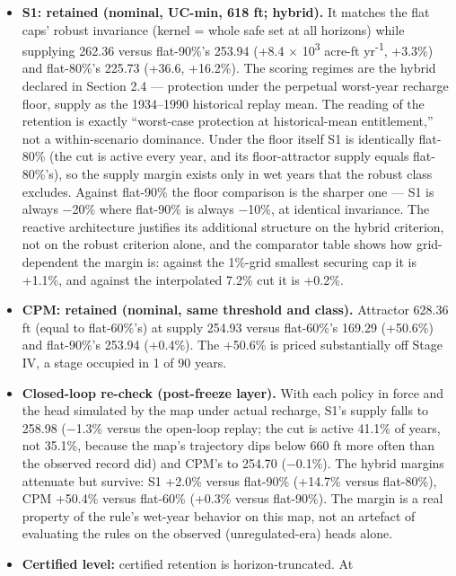 \documentclass[11pt]{article}
\providecommand{\tightlist}{\setlength{\itemsep}{0pt}\setlength{\parskip}{0pt}}
\begin{document}
\begin{itemize}
\tightlist
\item
  \textbf{S1: retained (nominal, UC-min, 618 ft; hybrid).} It matches
  the flat caps' robust invariance (kernel = whole safe set at all
  horizons) while supplying 262.36 versus flat-90\%'s 253.94 (+8.4 \ensuremath{\times} 10\textsuperscript{3}
  acre-ft yr\textsuperscript{-1}, +3.3\%) and flat-80\%'s 225.73 (+36.6, +16.2\%). The
  scoring regimes are the hybrid declared in Section 2.4 --- protection
  under the perpetual worst-year recharge floor, supply as the
  1934--1990 historical replay mean. The reading of the retention is
  exactly ``worst-case protection at historical-mean entitlement,'' not
  a within-scenario dominance. Under the floor itself S1 is identically
  flat-80\% (the cut is active every year, and its floor-attractor
  supply equals flat-80\%'s), so the supply margin exists only in wet
  years that the robust class excludes. Against flat-90\% the floor
  comparison is the sharper one --- S1 is always \ensuremath{-}20\% where flat-90\%
  is always \ensuremath{-}10\%, at identical invariance. The reactive architecture
  justifies its additional structure on the hybrid criterion, not on the
  robust criterion alone, and the comparator table shows how
  grid-dependent the margin is: against the 1\%-grid smallest securing
  cap it is +1.1\%, and against the interpolated 7.2\% cut it is +0.2\%.
\item
  \textbf{CPM: retained (nominal, same threshold and class).} Attractor
  628.36 ft (equal to flat-60\%'s) at supply 254.93 versus flat-60\%'s
  169.29 (+50.6\%) and flat-90\%'s 253.94 (+0.4\%). The +50.6\% is
  priced substantially off Stage IV, a stage occupied in 1 of 90 years.
\item
  \textbf{Closed-loop re-check (post-freeze layer).} With each policy in
  force and the head simulated by the map under actual recharge, S1's
  supply falls to 258.98 (\ensuremath{-}1.3\% versus the open-loop replay; the cut is
  active 41.1\% of years, not 35.1\%, because the map's trajectory dips
  below 660 ft more often than the observed record did) and CPM's to
  254.70 (\ensuremath{-}0.1\%). The hybrid margins attenuate but survive: S1 +2.0\%
  versus flat-90\% (+14.7\% versus flat-80\%), CPM +50.4\% versus
  flat-60\% (+0.3\% versus flat-90\%). The margin is a real property of
  the rule's wet-year behavior on this map, not an artefact of
  evaluating the rules on the observed (unregulated-era) heads alone.
\item
  \textbf{Certified level:} certified retention is horizon-truncated. At

\end{itemize}
\end{document}
